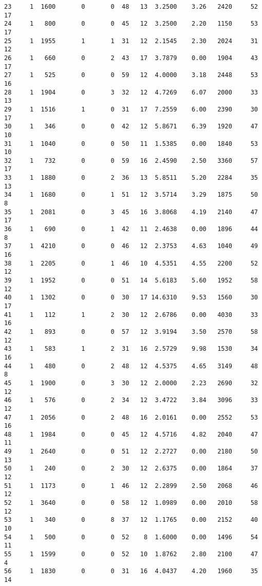 \documentclass[
  letterpaper,
  DIV=11,
  numbers=noendperiod]{scrreprt}
\begin{document}
\begin{verbatim}
23     1  1600       0       0  48   13  3.2500    3.26   2420     52      17
24     1   800       0       0  45   12  3.2500    2.20   1150     53      17
25     1  1955       1       1  31   12  2.1545    2.30   2024     31      12
26     1   660       0       2  43   17  3.7879    0.00   1904     43      17
27     1   525       0       0  59   12  4.0000    3.18   2448     53      16
28     1  1904       0       3  32   12  4.7269    6.07   2000     33      13
29     1  1516       1       0  31   17  7.2559    6.00   2390     30      17
30     1   346       0       0  42   12  5.8671    6.39   1920     47      10
31     1  1040       0       0  50   11  1.5385    0.00   1840     53      10
32     1   732       0       0  59   16  2.4590    2.50   3360     57      17
33     1  1880       0       2  36   13  5.8511    5.20   2284     35      13
34     1  1680       0       1  51   12  3.5714    3.29   1875     50       8
35     1  2081       0       3  45   16  3.8068    4.19   2140     47      17
36     1   690       0       1  42   11  2.4638    0.00   1896     44       8
37     1  4210       0       0  46   12  2.3753    4.63   1040     49      16
38     1  2205       0       1  46   10  4.5351    4.55   2200     52      12
39     1  1952       0       0  51   14  5.6183    5.60   1952     58      12
40     1  1302       0       0  30   17 14.6310    9.53   1560     30      17
41     1   112       1       2  30   12  2.6786    0.00   4030     33      16
42     1   893       0       0  57   12  3.9194    3.50   2570     58      12
43     1   583       1       2  31   16  2.5729    9.98   1530     34      16
44     1   480       0       2  48   12  4.5375    4.65   3149     48       8
45     1  1900       0       3  30   12  2.0000    2.23   2690     32      12
46     1   576       0       2  34   12  3.4722    3.84   3096     33      12
47     1  2056       0       2  48   16  2.0161    0.00   2552     53      16
48     1  1984       0       0  45   12  4.5716    4.82   2040     47      11
49     1  2640       0       0  51   12  2.2727    0.00   2180     50      13
50     1   240       0       2  30   12  2.6375    0.00   1864     37      12
51     1  1173       0       1  46   12  2.2899    2.50   2068     46      12
52     1  3640       0       0  58   12  1.0989    0.00   2010     58      12
53     1   340       0       8  37   12  1.1765    0.00   2152     40      10
54     1   500       0       0  52    8  1.6000    0.00   1496     54      11
55     1  1599       0       0  52   10  1.8762    2.80   2100     47       4
56     1  1830       0       0  31   16  4.0437    4.20   1960     35      14

\end{verbatim}
\end{document}
